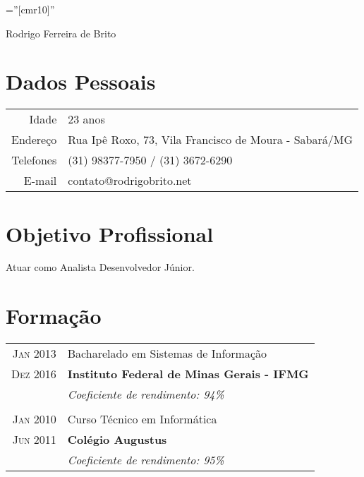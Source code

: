 \documentclass[a4paper,10pt]{article}
\begin{document}
\pagestyle{empty} %

\font\fb=''[cmr10]'' %

\vspace*{-1.4cm}
\par{\centering
	{\Huge Rodrigo Ferreira de Brito
}\bigskip\par}

\section{Dados Pessoais}

\begin{tabular}{rl}
Idade & 23 anos\\
Endereço & Rua Ipê Roxo, 73, Vila Francisco de Moura - Sabará/MG\\    
Telefones & (31) 98377-7950 / (31) 3672-6290\\
E-mail & contato@rodrigobrito.net\\
\end{tabular}

\section{Objetivo Profissional}

Atuar como Analista Desenvolvedor Júnior.

\section{Formação}
\begin{tabular}{r|p{13.1cm}}
	\textsc{Jan 2013} & Bacharelado em Sistemas de Informação\\
	\textsc{Dez 2016} & \textbf{Instituto Federal de Minas Gerais - IFMG}\\
	&\small\emph{Coeficiente de rendimento: 94\%}\\
	\multicolumn{2}{c}{} \\
	\textsc{Jan 2010}& Curso Técnico em Informática \\
	\textsc{Jun 2011}& \textbf{Colégio Augustus}\\
	&\small\emph{Coeficiente de rendimento: 95\%}\\
\end{tabular}
\end{document}
